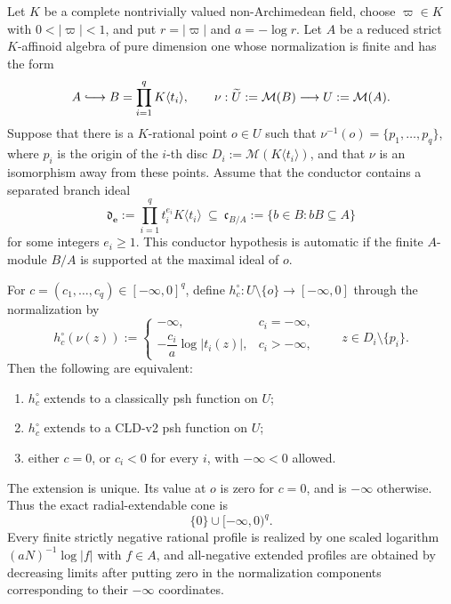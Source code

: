 \begin{theorem}
\label{thm:p122-conductorial-disc-radial-psh-classification}
Let \(K\) be a complete nontrivially valued non-Archimedean field, choose
\(\varpi\in K\) with \(0<|\varpi|<1\), and put
\(r=|\varpi|\) and \(a=-\log r\).  Let \(A\) be a reduced strict
\(K\)-affinoid algebra of pure dimension one whose normalization is finite
and has the form
\[
 A\lhook\joinrel\longrightarrow
 B=\prod_{i=1}^q K\langle t_i\rangle,
 \qquad
 \nu:\widetilde U:=\mathcal M(B)\longrightarrow U:=\mathcal M(A).
\]
Suppose that there is a \(K\)-rational point \(o\in U\) such that
\(\nu^{-1}(o)=\{p_1,\ldots,p_q\}\), where \(p_i\) is the origin of the
\(i\)-th disc \(D_i:=\mathcal M(K\langle t_i\rangle)\), and that \(\nu\)
is an isomorphism away from these points.  Assume that the conductor
contains a separated branch ideal
\[
 \mathfrak d_{\boldsymbol e}
   :=\prod_{i=1}^q t_i^{e_i}K\langle t_i\rangle
   \ \subseteq\
 \mathfrak c_{B/A}:=\{b\in B:bB\subseteq A\}
 \tag{\(\blacktriangledown\)}
 \label{eq:p122-disc-conductor-branch-ideal}
\]
for some integers \(e_i\geq1\).  This conductor hypothesis is automatic if
the finite \(A\)-module \(B/A\) is supported at the maximal ideal of \(o\).

For \(c=(c_1,\ldots,c_q)\in[-\infty,0]^q\), define
\(h_c^\circ:U\setminus\{o\}\to[-\infty,0]\) through the normalization by
\[
 h_c^\circ(\nu(z)):=
 \begin{cases}
  -\infty,&c_i=-\infty,\\[1mm]
  -\dfrac{c_i}{a}\log|t_i(z)|,&c_i> -\infty,
 \end{cases}
 \qquad z\in D_i\setminus\{p_i\}.
 \tag{\(\blacktriangleleft\)}
 \label{eq:p122-disc-normalized-radial-function}
\]
Then the following are equivalent:
\begin{enumerate}
\item \(h_c^\circ\) extends to a classically psh function on \(U\);
\item \(h_c^\circ\) extends to a CLD-v2 psh function on \(U\);
\item either \(c=0\), or \(c_i<0\) for every \(i\), with
      \(-\infty<0\) allowed.
\end{enumerate}
The extension is unique.  Its value at \(o\) is zero for \(c=0\), and is
\(-\infty\) otherwise.  Thus the exact radial-extendable cone is
\[
                         \{0\}\cup[-\infty,0)^q.
 \tag{\(\blacktriangleright\)}
 \label{eq:p122-disc-normalized-radial-cone}
\]
Every finite strictly negative rational profile is realized by one scaled
logarithm \((aN)^{-1}\log|f|\) with \(f\in A\), and all-negative extended
profiles are obtained by decreasing limits after putting zero in the
normalization components corresponding to their \(-\infty\) coordinates.
\end{theorem}


